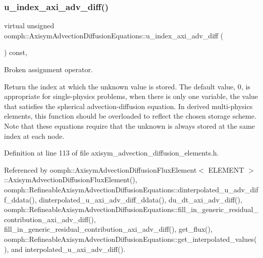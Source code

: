 \subsubsection{\texorpdfstring{u\+\_\+index\+\_\+axi\+\_\+adv\+\_\+diff()}{u\_index\_axi\_adv\_diff()}}
{\footnotesize\ttfamily virtual unsigned oomph\+::\+Axisym\+Advection\+Diffusion\+Equations\+::u\+\_\+index\+\_\+axi\+\_\+adv\+\_\+diff (\begin{DoxyParamCaption}{ }\end{DoxyParamCaption}) const\hspace{0.3cm}{\ttfamily [inline]}, {\ttfamily [virtual]}}



Broken assignment operator. 

Return the index at which the unknown value is stored. The default value, 0, is appropriate for single-\/physics problems, when there is only one variable, the value that satisfies the spherical advection-\/diffusion equation. In derived multi-\/physics elements, this function should be overloaded to reflect the chosen storage scheme. Note that these equations require that the unknown is always stored at the same index at each node. 

Definition at line 113 of file axisym\+\_\+advection\+\_\+diffusion\+\_\+elements.\+h.



Referenced by oomph\+::\+Axisym\+Advection\+Diffusion\+Flux\+Element$<$ E\+L\+E\+M\+E\+N\+T $>$\+::\+Axisym\+Advection\+Diffusion\+Flux\+Element(), oomph\+::\+Refineable\+Axisym\+Advection\+Diffusion\+Equations\+::dinterpolated\+\_\+u\+\_\+adv\+\_\+diff\+\_\+ddata(), dinterpolated\+\_\+u\+\_\+axi\+\_\+adv\+\_\+diff\+\_\+ddata(), du\+\_\+dt\+\_\+axi\+\_\+adv\+\_\+diff(), oomph\+::\+Refineable\+Axisym\+Advection\+Diffusion\+Equations\+::fill\+\_\+in\+\_\+generic\+\_\+residual\+\_\+contribution\+\_\+axi\+\_\+adv\+\_\+diff(), fill\+\_\+in\+\_\+generic\+\_\+residual\+\_\+contribution\+\_\+axi\+\_\+adv\+\_\+diff(), get\+\_\+flux(), oomph\+::\+Refineable\+Axisym\+Advection\+Diffusion\+Equations\+::get\+\_\+interpolated\+\_\+values(), and interpolated\+\_\+u\+\_\+axi\+\_\+adv\+\_\+diff().

\mbox{\label{classoomph_1_1AxisymAdvectionDiffusionEquations_a961d34684ce6d565ad387b41b2bd92de}} 
